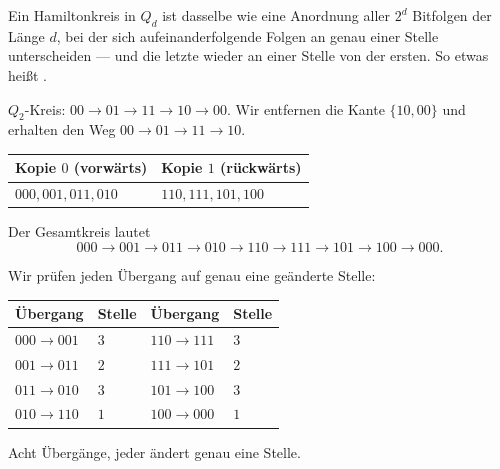 \begin{merksatz}
Ein Hamiltonkreis in $Q_d$ ist dasselbe wie eine Anordnung aller $2^d$ Bitfolgen der Länge $d$, bei der sich aufeinanderfolgende Folgen an genau einer Stelle unterscheiden --- und die letzte wieder an einer Stelle von der ersten. So etwas heißt .

$Q_2$-Kreis: $00 \to 01 \to 11 \to 10 \to 00$. Wir entfernen die Kante $\{10, 00\}$ und erhalten den Weg $00 \to 01 \to 11 \to 10$.

\begin{center}
\renewcommand{\arraystretch}{1.4}
\begin{tabular}{@{}P{4.2cm}P{4.2cm}@{}}
\toprule
\textbf{Kopie $0$ (vorwärts)} & \textbf{Kopie $1$ (rückwärts)}\\
\midrule
$000, 001, 011, 010$ & $110, 111, 101, 100$\\
\bottomrule
\end{tabular}
\end{center}

Der Gesamtkreis lautet
\[ 000 \to 001 \to 011 \to 010 \to 110 \to 111 \to 101 \to 100 \to 000 . \]

Wir prüfen jeden Übergang auf genau eine geänderte Stelle:
\begin{center}
{\small
\renewcommand{\arraystretch}{1.32}
\begin{tabular}{@{}P{2.4cm}P{1.8cm}P{2.4cm}P{1.8cm}@{}}
\toprule
\textbf{Übergang} & \textbf{Stelle} & \textbf{Übergang} & \textbf{Stelle}\\
\midrule
$000 \to 001$ & $3$ & $110 \to 111$ & $3$\\
$001 \to 011$ & $2$ & $111 \to 101$ & $2$\\
$011 \to 010$ & $3$ & $101 \to 100$ & $3$\\
$010 \to 110$ & $1$ & $100 \to 000$ & $1$\\
\bottomrule
\end{tabular}}
\end{center}
Acht Übergänge, jeder ändert genau eine Stelle. \checkmark

\begin{center}
\begin{minipage}{0.88\textwidth}
\end{minipage}
\end{center}
\end{merksatz}

